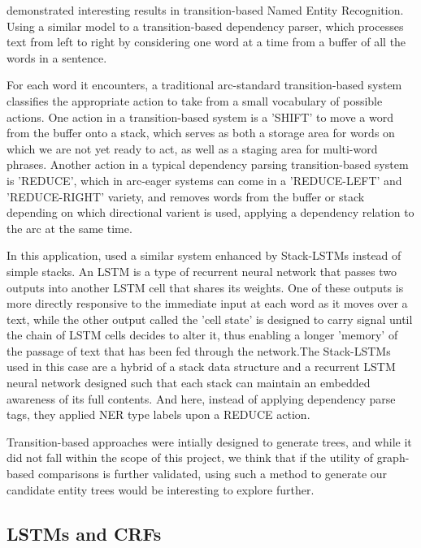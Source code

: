 \documentclass[11pt,a4paper]{article}
\begin{document}
\citet{LampleNeuralArchitecturesNamed2016} demonstrated interesting results in transition-based Named Entity Recognition. Using a similar model to a transition-based dependency parser, which processes text from left to right by considering one word at a time from a buffer of all the words in a sentence.

For each word it encounters, a traditional arc-standard transition-based system\cite{NivreIncrementalityDeterministicDependency2004} classifies the appropriate action to take from a small vocabulary of possible actions. One action in a transition-based system is a 'SHIFT' to move a word from the buffer onto a stack, which serves as both a storage area for words on which we are not yet ready to act, as well as a staging area for multi-word phrases. Another action in a typical dependency parsing transition-based system is 'REDUCE', which in arc-eager systems can come in a 'REDUCE-LEFT' and 'REDUCE-RIGHT' variety, and removes words from the buffer or stack depending on which directional varient is used, applying a dependency relation to the arc at the same time.

In this application, \citet{LampleNeuralArchitecturesNamed2016} used a similar system enhanced by Stack-LSTMs\cite{DyerTransitionBasedDependencyParsing2015} instead of simple stacks. An LSTM is a type of recurrent neural network that passes two outputs into another LSTM cell that shares its weights. One of these outputs is more directly responsive to the immediate input at each word as it moves over a text, while the other output called the 'cell state' is designed to carry signal until the chain of LSTM cells decides to alter it, thus enabling a longer 'memory' of the passage of text that has been fed through the network.The Stack-LSTMs used in this case are a hybrid of a stack data structure and a recurrent LSTM neural network designed such that each stack can maintain an embedded awareness of its full contents. And here, instead of applying dependency parse tags, they applied NER type labels upon a REDUCE action.

Transition-based approaches were intially designed to generate trees, and while it did not fall within the scope of this project, we think that if the utility of graph-based comparisons is further validated, using such a method to generate our candidate entity trees would be interesting to explore further.

\subsection{LSTMs and CRFs}
\end{document}
